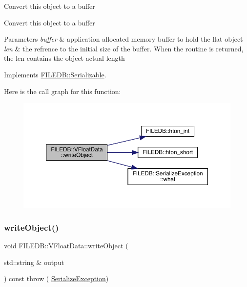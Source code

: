 Convert this object to a buffer

Convert this object to a buffer


\begin{DoxyParams}{Parameters}
{\em buffer} & application allocated memory buffer to hold the flat object \\
\hline
{\em len} & the refrence to the initial size of the buffer. When the routine is returned, the len contains the object actual length \\
\hline
\end{DoxyParams}


Implements \mbox{\hyperlink{classFILEDB_1_1Serializable_a8deaa86e108c08c863881e46cf5578ea}{F\+I\+L\+E\+D\+B\+::\+Serializable}}.

Here is the call graph for this function\+:
\nopagebreak
\begin{figure}[H]
\begin{center}
\leavevmode
\includegraphics[width=350pt]{d3/d37/classFILEDB_1_1VFloatData_afad9c7e520cdd7bf9ae0b477b8a5f1f1_cgraph}
\end{center}
\end{figure}
\mbox{\label{classFILEDB_1_1VFloatData_afad9c7e520cdd7bf9ae0b477b8a5f1f1}} 
\subsubsection{\texorpdfstring{writeObject()}{writeObject()}\hspace{0.1cm}{\footnotesize\ttfamily [2/2]}}
{\footnotesize\ttfamily void F\+I\+L\+E\+D\+B\+::\+V\+Float\+Data\+::write\+Object (\begin{DoxyParamCaption}\item[{std\+::string \&}]{output }\end{DoxyParamCaption}) const throw ( \mbox{\hyperlink{classFILEDB_1_1SerializeException}{Serialize\+Exception}}) \hspace{0.3cm}{\ttfamily [virtual]}}

